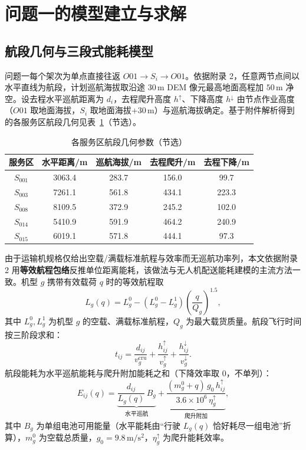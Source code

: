 \section{问题一的模型建立与求解}

\subsection{航段几何与三段式能耗模型}

问题一每个架次为单点直接往返 $O01\to S_i\to O01$。依据附录 2，任意两节点间以水平直线为航段，计划巡航海拔取沿途 $30\,$m DEM\cite{ref_dem} 像元最高地面高程加 $50\,$m 净空。设去程水平巡航距离为 $d_i$，去程爬升高度 $h^{\uparrow}$、下降高度 $h^{\downarrow}$ 由节点作业高度（$O01$ 取地面海拔，$S_i$ 取地面海拔$+30\,$m）与巡航海拔确定。基于附件解析得到的各服务区航段几何见表~\ref{tab:geo}（节选）。

\begin{table}[htbp]
\centering
\caption{各服务区航段几何参数（节选）}
\label{tab:geo}
\renewcommand{\arraystretch}{1.2}
\begin{tabular}{c|c|c|c|c}
\toprule
服务区 & 水平距离/m & 巡航海拔/m & 去程爬升/m & 去程下降/m \\
\midrule
$S_{001}$ & 3063.4 & 283.7 & 156.0 & 99.7 \\
$S_{003}$ & 7261.1 & 561.8 & 434.1 & 223.3 \\
$S_{008}$ & 8109.5 & 372.9 & 245.2 & 102.0 \\
$S_{014}$ & 5410.9 & 591.9 & 464.2 & 240.9 \\
$S_{015}$ & 6019.1 & 571.8 & 444.1 & 97.3 \\
\bottomrule
\end{tabular}
\end{table}

由于运输机规格仅给出空载/满载标准航程与效率而无巡航功率列，本文依据附录 2 用\textbf{等效航程包络}反推单位距离能耗，该做法与无人机配送能耗建模的主流方法一致\cite{ref_dorling,ref_zhang}。机型 $g$ 携带有效载荷 $q$ 时的等效航程取
\begin{equation}
L_g(q)=L_g^{0}-\left(L_g^{0}-L_g^{1}\right)\left(\frac{q}{Q_g}\right)^{1.5},
\end{equation}
其中 $L_g^{0},L_g^{1}$ 为机型 $g$ 的空载、满载标准航程，$Q_g$ 为最大载货质量。航段飞行时间按三阶段求和：
\begin{equation}
t_{ij}=\frac{d_{ij}}{v_g^{\text{cru}}}+\frac{h^{\uparrow}_{ij}}{v_g^{\uparrow}}+\frac{h^{\downarrow}_{ij}}{v_g^{\downarrow}}.
\end{equation}
航段能耗为水平巡航能耗与爬升附加能耗之和（下降效率取 $0$，不单列）：
\begin{equation}
E_{ij}(q)=\underbrace{\frac{d_{ij}}{L_g(q)}\,B_g}_{\text{水平巡航}}+\underbrace{\frac{(m_g^{0}+q)\,g_0\,h^{\uparrow}_{ij}}{3.6\times10^{6}\,\eta^{\uparrow}_g}}_{\text{爬升附加}},
\end{equation}
其中 $B_g$ 为单组电池可用能量（水平能耗由“行驶 $L_g(q)$ 恰好耗尽一组电池”折算），$m_g^{0}$ 为空载总质量，$g_0=9.8\,\mathrm{m/s^2}$，$\eta^{\uparrow}_g$ 为爬升能耗效率。

